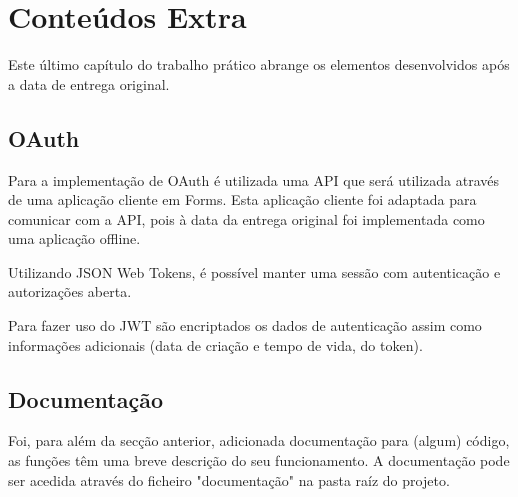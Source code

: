 \chapter{Conteúdos Extra}

Este último capítulo do trabalho prático abrange os elementos desenvolvidos após a data de entrega original.

\section{OAuth}

Para a implementação de OAuth é utilizada uma API que será utilizada através de uma aplicação cliente em Forms. Esta aplicação cliente foi adaptada para comunicar com a API, pois à data da entrega original foi implementada como uma aplicação offline.

Utilizando JSON Web Tokens, é possível manter uma sessão com autenticação e autorizações aberta. 

Para fazer uso do JWT são encriptados os dados de autenticação assim como informações adicionais (data de criação e tempo de vida, do token).


\section{Documentação}

Foi, para além da secção anterior, adicionada documentação para (algum) código, as funções têm uma breve descrição do seu funcionamento. A documentação pode ser acedida através do ficheiro "documentação" na pasta raíz do projeto.